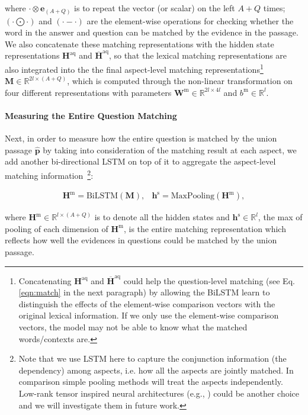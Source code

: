 \documentclass{article} \usepackage{iclr2018_conference,times}
\begin{document}
where $\cdot \otimes \mathbf{e}_{(A+Q)}$ is to repeat the vector (or scalar) on the left $A+Q$ times; $(\cdot \bigodot \cdot )$ and $(\cdot - \cdot )$ are the element-wise operations for checking whether the word in the answer and question can be matched by the evidence in the passage. We also concatenate these matching representations with the hidden state representations $\mathbf{H}^{\text{aq}}$ and $\overline{\mathbf{H}}^{\text{aq}}$,
so that the lexical matching representations are also integrated into the
the final aspect-level matching representations\footnote{Concatenating $\mathbf{H}^{\text{aq}}$ and $\overline{\mathbf{H}}^{\text{aq}}$ could help the question-level matching (see Eq. \ref{eqn:match} in the next paragraph) by allowing the BiLSTM learn to distinguish the effects of the element-wise comparison vectors with the original lexical information. If we only use the element-wise comparison vectors, the model may not be able to know what the matched words/contexts are.}
$\mathbf{M}\in \mathbb{R}^{2l\times (A+Q)}$, which is computed through the non-linear transformation on four different representations with parameters $\mathbf{W}^\text{m}\in \mathbb{R}^{2l\times 4l}$ and $b^{\text{m}}\in \mathbb{R}^l$. 

\paragraph{Measuring the Entire Question Matching}
Next, in order to measure how the entire question is matched by the union passage $\mathbf{\hat{p}}$ by taking into consideration of the matching result at each aspect, we add another bi-directional LSTM on top of it to aggregate the aspect-level matching information~\footnote{Note that we use LSTM here to capture the conjunction information (the dependency) among aspects, i.e. how all the aspects are jointly matched. In comparison simple pooling methods will treat the aspects independently. Low-rank tensor inspired neural architectures (e.g., \citet{lei2017deriving}) could be another choice and we will investigate them in future work.}:

\begin{equation}
\begin{matrix}
\mathbf{H}^{\text{m}} = \text{BiLSTM} (\mathbf{M}), &
\mathbf{h}^{\text{s}} = \text{MaxPooling}(\mathbf{H}^{\text{m}}),
\label{eqn:match}
\end{matrix}
\end{equation}


where $\mathbf{H}^{\text{m}}\in \mathbb{R}^{l\times (A+Q)}$ is to denote all the hidden states and $\mathbf{h}^{\text{s}}\in \mathbb{R}^l$, the max of pooling of each dimension of $\mathbf{H}^{\text{m}}$, is the entire matching representation which reflects how well the evidences in questions could be matched by the union passage.
\end{document}
